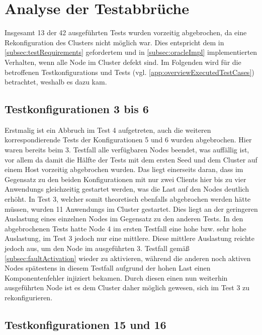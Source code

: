 \section{Analyse der Testabbrüche}
\label{sec:noReconfig}

Insgesamt 13 der 42 ausgeführten \glspl{Test} wurden vorzeitig abgebrochen, da eine Rekonfiguration des Clusters nicht möglich war.
Dies entspricht dem in \cref{subsec:testRequirements} gefordertem und in \cref{subsec:oracleImpl} implementierten Verhalten, wenn alle Node im Cluster defekt sind.
Im Folgenden wird für die betroffenen \glspl{Testkonfiguration} und \glspl{Test} (vgl. \cref{app:overviewExecutedTestCases}) betrachtet, weshalb es dazu kam.

\subsection{Testkonfigurationen 3 bis 6}
\label{subsec:noReconf36}

Erstmalig ist ein Abbruch im \gls{Test} 4 aufgetreten, auch die weiteren korrespondierende \glspl{Test} der Konfigurationen 5 und 6 wurden abgebrochen.
Hier waren bereits beim 3. \gls{Testfall} alle verfügbaren Nodes beendet, was auffällig ist, vor allem da damit die Hälfte der \glspl{Test} mit dem ersten Seed und dem Cluster auf einem Host vorzeitig abgebrochen wurden.
Das liegt einerseits daran, dass im Gegensatz zu den beiden Konfigurationen mit nur zwei Clients hier bis zu vier \glspl{Anwendung} gleichzeitig gestartet werden, was die Last auf den Nodes deutlich erhöht.
In \gls{Test} 3, welcher somit theoretisch ebenfalls abgebrochen werden hätte müssen, wurden 11 \glspl{Anwendung} im Cluster gestartet.
Dies liegt an der geringeren Auslastung eines einzelnen Nodes im Gegensatz zu den anderen Tests.
In den abgebrochenen \glspl{Test} hatte Node 4 im ersten \gls{Testfall} eine hohe bzw. sehr hohe Auslastung, im \gls{Test} 3 jedoch nur eine mittlere.
Diese mittlere Auslastung reichte jedoch aus, um den Node im ausgeführten 3. \gls{Testfall} gemäß \cref{subsec:faultActivation} wieder zu aktivieren, während die anderen noch aktiven Nodes spätestens in diesem \gls{Testfall} aufgrund der hohen Last einen Komponentenfehler injiziert bekamen.
Durch diesen einen nun weiterhin ausgeführten Node ist es dem Cluster daher möglich gewesen, sich im \gls{Test} 3 zu rekonfigurieren.

\subsection{Testkonfigurationen 15 und 16}
\label{subsec:noReconf1516}

